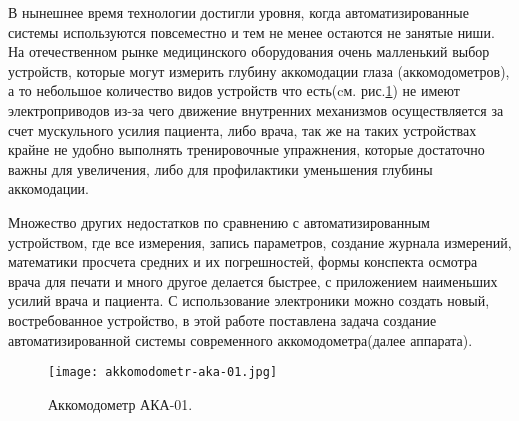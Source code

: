 В нынешнее время технологии достигли уровня, когда автоматизированные системы используются повсеместно и тем не менее остаются не занятые ниши. На отечественном рынке медицинского оборудования очень малленький выбор устройств, которые могут измерить глубину аккомодации глаза (аккомодометров), а то небольшое количество видов устройств что есть(cм. рис.\ref{fig:aka-01}) не имеют электроприводов из-за чего движение внутренних механизмов осуществляется за счет мускульного усилия пациента, либо врача, так же на таких устройствах крайне не удобно выполнять тренировочные упражнения, которые достаточно важны для увеличения, либо для профилактики уменьшения глубины аккомодации.

Множество других недостатков по сравнению с автоматизированным устройством, где все измерения, запись параметров, создание журнала измерений, математики просчета средних и их погрешностей, формы конспекта осмотра врача для печати и много другое делается быстрее, с приложением наименьших усилий врача и пациента. С использование электроники можно создать новый, востребованное устройство, в этой работе поставлена задача создание автоматизированной системы современного аккомодометра(далее аппарата).
\begin{figure}[ht]
    \centering
    \texttt{[image: akkomodometr-aka-01.jpg]}
    \caption{Аккомодометр АКА-01.}
    \label{fig:aka-01}
\end{figure}	